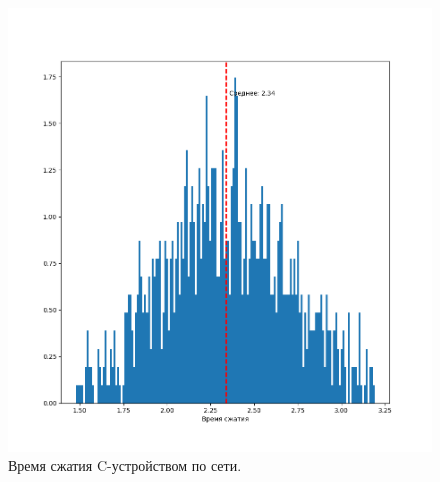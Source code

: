 \begin{figure}[!htbp]
    \centering
    \begin{adjustbox}{max totalsize={\textwidth}{\textheight}}
        \includegraphics{images/hist-lib-c-network.png}
    \end{adjustbox}
    \caption{Время сжатия C-устройством по сети.}\label{fig:hist-lib-c-network}
\end{figure}


